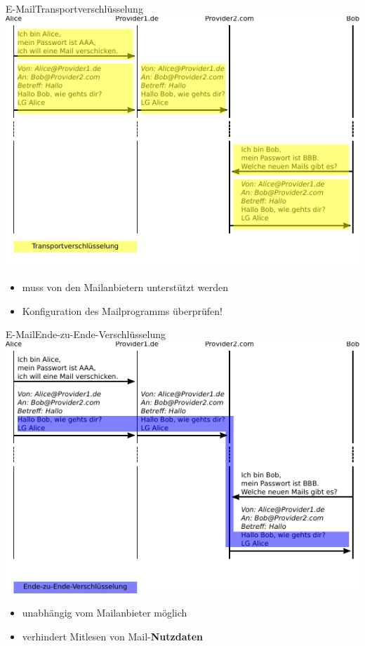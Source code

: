 \begin{frame}{E-Mail}{Transportverschlüsselung}
  \includegraphics[width=.9\textwidth]{images/maildaten_trans.pdf}
  \begin{itemize}
    \scriptsize
    \item muss von den Mailanbietern unterstützt werden
    \item Konfiguration des Mailprogramms überprüfen!
  \end{itemize}
\end{frame}

\begin{frame}{E-Mail}{Ende-zu-Ende-Verschlüsselung}
  \includegraphics[width=.9\textwidth]{images/maildaten_e2e.pdf}
  \begin{itemize}
    \scriptsize
    \item unabhängig vom Mailanbieter möglich
    \item verhindert Mitlesen von Mail-\textbf{Nutzdaten}
  \end{itemize}
\end{frame}

